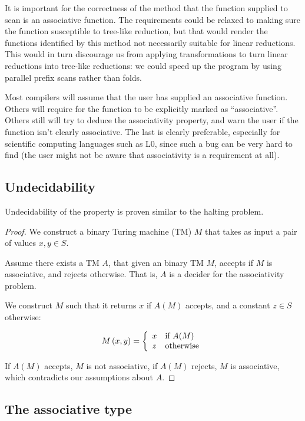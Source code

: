 It is important for the correctness of the method that the function supplied to
scan is an associative function. The requirements could be relaxed to making
sure the function susceptible to tree-like reduction, but that would render the
functions identified by this method not necessarily suitable for linear
reductions. This would in turn discourage us from applying transformations to
turn linear reductions into tree-like reductions: we could speed up the program
by using parallel prefix scans rather than folds.

Most compilers will assume that the user has supplied an associative function.
Others will require for the function to be explicitly marked as
``associative''. Others still will try to deduce the associativity property,
and warn the user if the function isn't clearly associative. The last is
clearly preferable, especially for scientific computing languages such as L0,
since such a bug can be very hard to find (the user might not be aware that
associativity is a requirement at all).

\subsection{Undecidability}

Undecidability of the property is proven similar to the halting problem.

\begin{proof} We construct a binary Turing machine (TM) $M$ that takes as input
a pair of values $x,y\in S$.

Assume there exists a TM $A$, that given an binary TM $M$, accepts if $M$ is
associative, and rejects otherwise. That is, $A$ is a decider for the
associativity problem.

We construct $M$ such that it returns $x$ if $A(M)$ accepts, and a constant
$z\in S$ otherwise:

\[M\left({x,y}\right) = \left\{ \begin{array}{l l} x & \text{if $A(M)$} \\ z &
\text{otherwise} \end{array} \right.\]

If $A(M)$ accepts, $M$ is not associative, if $A(M)$ rejects, $M$ is
associative, which contradicts our assumptions about $A$. \end{proof}

\subsection{The associative type}

